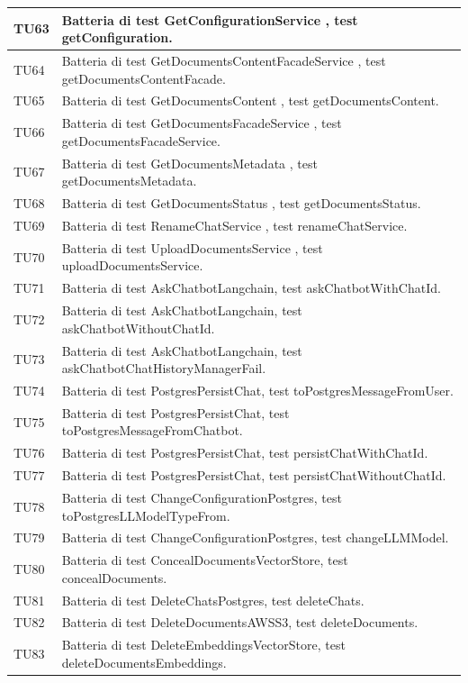 \documentclass[10pt, a4paper]{article}
\begin{document}
\begin{xltabular}{\textwidth}{p{0.12\textwidth}|X}
\hline
TU63 & Batteria di test GetConfigurationService , test getConfiguration. \\
\hline
TU64 & Batteria di test GetDocumentsContentFacadeService , test getDocumentsContentFacade. \\
\hline
TU65 & Batteria di test GetDocumentsContent , test getDocumentsContent. \\
\hline
TU66 & Batteria di test GetDocumentsFacadeService , test getDocumentsFacadeService. \\
\hline
TU67 & Batteria di test GetDocumentsMetadata , test getDocumentsMetadata. \\
\hline
TU68 & Batteria di test GetDocumentsStatus , test getDocumentsStatus. \\
\hline
TU69 & Batteria di test RenameChatService , test renameChatService. \\
\hline
TU70 & Batteria di test UploadDocumentsService , test uploadDocumentsService. \\
\hline
TU71 & Batteria di test AskChatbotLangchain, test askChatbotWithChatId. \\
\hline
TU72 & Batteria di test AskChatbotLangchain, test askChatbotWithoutChatId. \\
\hline
TU73 & Batteria di test AskChatbotLangchain, test askChatbotChatHistoryManagerFail. \\
\hline
TU74 & Batteria di test PostgresPersistChat, test toPostgresMessageFromUser. \\
\hline
TU75 & Batteria di test PostgresPersistChat, test toPostgresMessageFromChatbot. \\
\hline
TU76 & Batteria di test PostgresPersistChat, test persistChatWithChatId. \\
\hline
TU77 & Batteria di test PostgresPersistChat, test persistChatWithoutChatId. \\
\hline
TU78 & Batteria di test ChangeConfigurationPostgres, test toPostgresLLModelTypeFrom. \\
\hline
TU79 & Batteria di test ChangeConfigurationPostgres, test changeLLMModel. \\
\hline
TU80 & Batteria di test ConcealDocumentsVectorStore, test concealDocuments. \\
\hline
TU81 & Batteria di test DeleteChatsPostgres, test deleteChats. \\
\hline
TU82 & Batteria di test DeleteDocumentsAWSS3, test deleteDocuments. \\
\hline
TU83 & Batteria di test DeleteEmbeddingsVectorStore, test deleteDocumentsEmbeddings. \\

\end{xltabular}
\end{document}
